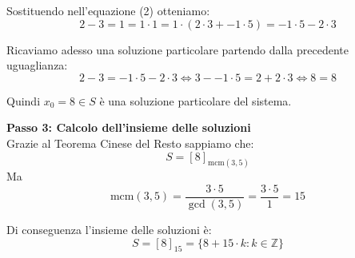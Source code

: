 \documentclass[12pt]{article}
\begin{document}
Sostituendo nell'equazione (2) otteniamo:
$$2 - 3 = 1 = 1 \cdot 1 = 1 \cdot (2 \cdot 3 + -1 \cdot 5) = -1 \cdot 5 - 2 \cdot 3$$

Ricaviamo adesso una soluzione particolare partendo dalla precedente uguaglianza:
$$2 - 3 = -1 \cdot 5 - 2 \cdot 3 \iff 3 - -1 \cdot 5 = 2 + 2 \cdot 3 \iff 8 = 8$$

Quindi $x_0 = 8 \in S$ è una soluzione particolare del sistema.


\textbf{Passo 3: Calcolo dell'insieme delle soluzioni} \\ 
Grazie al Teorema Cinese del Resto sappiamo che:
$$S = [8]_{\mathrm{mcm}(3, 5)}$$
Ma
$$\mathrm{mcm}({3}, {5}) = \frac{{3} \cdot {5}}{\gcd({3},{5})} = \frac{{3} \cdot {5}}{1} = {15}$$

Di conseguenza l'insieme delle soluzioni è:
        $$S = [8]_{15} = \{8 + 15 \cdot k : k \in \mathbb{Z}\}$$
        
\end{document}
